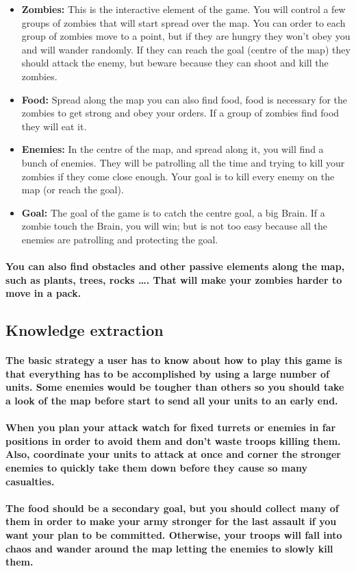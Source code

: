 \documentclass[a4paper,10pt]{article}
\newcommand{\p}[1]{\paragraph{\indent\textnormal{#1}}}
\begin{document}
    \begin{itemize}
     \item \textbf{Zombies:} This is the interactive element of the game. You will control a few groups of zombies that will start spread over the map. You can order to each group of zombies move to a point, but if they are hungry they won't obey you and will wander randomly. If they can reach the goal (centre of the map) they should attack the enemy, but beware because they can shoot and kill the zombies.
     \item \textbf{Food:} Spread along the map you can also find food, food is necessary for the zombies to get strong and obey your orders. If a group of zombies find food they will eat it.
     \item \textbf{Enemies:} In the centre of the map, and spread along it, you will find a bunch of enemies. They will be patrolling all the time and trying to kill your zombies if they come close enough. Your goal is to kill every enemy on the map (or reach the goal).
     \item \textbf{Goal:} The goal of the game is to catch the centre goal, a big Brain. If a zombie touch the Brain, you will win; but is not too easy because all the enemies are patrolling and protecting the goal.
    \end{itemize}

  \p{You can also find obstacles and other passive elements along the map, such as plants, trees, rocks \dots. That will make your zombies harder to move in a pack.}


  \subsection{Knowledge extraction}

    \p{The basic strategy a user has to know about how to play this game is that everything has to be accomplished by using a large number of units. Some enemies would be tougher than others so you should take a look of the map before start to send all your units to an early end.}

    \p{When you plan your attack watch for fixed turrets or enemies in far positions in order to avoid them and don't waste troops killing them. Also, coordinate your units to attack at once and corner the stronger enemies to quickly take them down before they cause so many casualties.}

    \p{The food should be a secondary goal, but you should collect many of them in order to make your army stronger for the last assault if you want your plan to be committed. Otherwise, your troops will fall into chaos and wander around the map letting the enemies to slowly kill them.}
\end{document}
